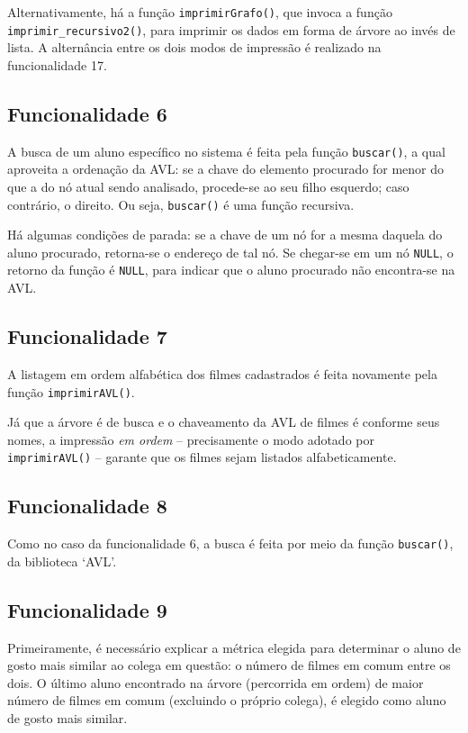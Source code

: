 \documentclass[12pt,a4paper,portuguese]{article}
\begin{document}
        Alternativamente, há a função \verb|imprimirGrafo()|, que invoca a função \verb|imprimir_recursivo2()|, para imprimir os dados em forma de árvore ao invés de lista. A alternância entre os dois modos de impressão é realizado na funcionalidade 17.

    \subsection*{Funcionalidade 6}
        A busca de um aluno específico no sistema é feita pela função \verb|buscar()|, a qual aproveita a ordenação da AVL: se a chave do elemento procurado for menor do que a do nó atual sendo analisado, procede-se ao seu filho esquerdo; caso contrário, o direito. Ou seja, \verb|buscar()| é uma função recursiva.

        Há algumas condições de parada: se a chave de um nó for a mesma daquela do aluno procurado, retorna-se o endereço de tal nó. Se chegar-se em um nó \verb|NULL|, o retorno da função é \verb|NULL|, para indicar que o aluno procurado não encontra-se na AVL.

    \subsection*{Funcionalidade 7}
        A listagem em ordem alfabética dos filmes cadastrados é feita novamente pela função \verb|imprimirAVL()|.
        
        Já que a árvore é de busca e o chaveamento da AVL de filmes é conforme seus nomes, a impressão \textit{em ordem} -- precisamente o modo adotado por \verb|imprimirAVL()| -- garante que os filmes sejam listados alfabeticamente.

    \subsection*{Funcionalidade 8}
        Como no caso da funcionalidade 6, a busca é feita por meio da função \verb|buscar()|, da biblioteca `AVL'.

    \subsection*{Funcionalidade 9}
        Primeiramente, é necessário explicar a métrica elegida para determinar o aluno de gosto mais similar ao colega em questão: o número de filmes em comum entre os dois. O último aluno encontrado na árvore (percorrida em ordem) de maior número de filmes em comum (excluindo o próprio colega), é elegido como aluno de gosto mais similar.
\end{document}
